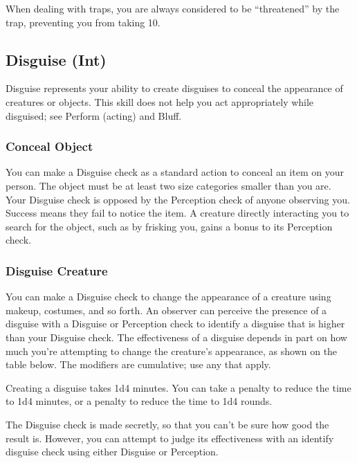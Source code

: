 When dealing with traps, you are always considered to be ``threatened'' by the trap, preventing you from taking 10.

\subsection{Disguise (Int)}
Disguise represents your ability to create disguises to conceal the appearance of creatures or objects. This skill does not help you act appropriately while disguised; see Perform (acting) and Bluff.

\subsubsection{Conceal Object}
You can make a Disguise check as a standard action to conceal an item on your person. The object must be at least two size categories smaller than you are. Your Disguise check is opposed by the Perception check of anyone observing you. Success means they fail to notice the item. A creature directly interacting you to search for the object, such as by frisking you, gains a  bonus to its Perception check.

\subsubsection{Disguise Creature}
You can make a Disguise check to change the appearance of a creature using makeup, costumes, and so forth. An observer can perceive the presence of a disguise with a Disguise or Perception check to identify a disguise that is higher than your Disguise check. The effectiveness of a disguise depends in part on how much you're attempting to change the creature's appearance, as shown on the table below. The modifiers are cumulative; use any that apply.

Creating a disguise takes 1d4  minutes. You can take a  penalty to reduce the time to 1d4 minutes, or a  penalty to reduce the time to 1d4 rounds.

The Disguise check is made secretly, so that you can't be sure how good the result is. However, you can attempt to judge its effectiveness with an identify disguise check using either Disguise or Perception. 

